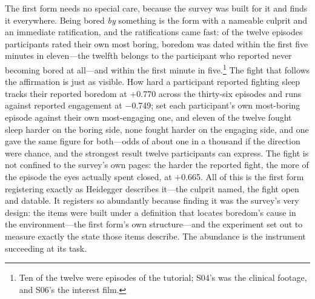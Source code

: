The first form needs no special care, because the survey was built for it and finds it everywhere.
Being bored \textit{by} something is the form with a nameable culprit and an immediate
ratification, and the ratifications came fast: of the twelve episodes participants rated their
own most boring, boredom was dated within the first five minutes in eleven---the twelfth
belongs to the participant who reported never becoming bored at all---and within the first
minute in five.\footnote{Ten of the twelve were episodes of the tutorial; S04's was the
clinical footage, and S06's the interest film.} The fight that follows the affirmation is just
as visible. How hard a participant reported fighting sleep tracks their reported boredom at
$+$0.770 across the thirty-six episodes and runs against reported engagement at $-$0.749; set
each participant's own most-boring episode against their own most-engaging one, and eleven of
the twelve fought sleep harder on the boring side, none fought harder on the engaging side, and
one gave the same figure for both---odds of about one in a thousand if the direction were
chance, and the strongest result twelve participants can express. The fight is not confined to
the survey's own pages: the harder the reported fight, the more of the episode the eyes
actually spent closed, at $+$0.665. All of this is the first form registering exactly as
Heidegger describes it---the culprit named, the fight open and datable. It registers so
abundantly because finding it was the survey's very design: the items were built under a
definition that locates boredom's cause in the environment---the first form's own
structure---and the experiment set out to measure exactly the state those items describe. The
abundance is the instrument succeeding at its task.

